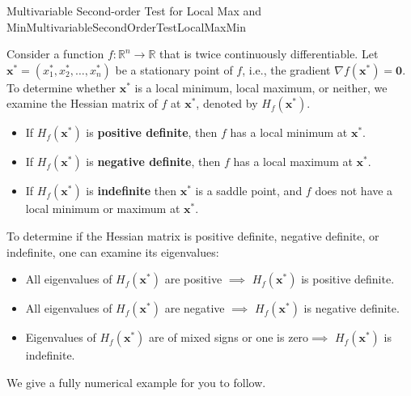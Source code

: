 \begin{propColor}{Multivariable Second-order Test for Local Max and Min}{MultivariableSecondOrderTestLocalMaxMin}


Consider a function \(f: \mathbb{R}^n \to \mathbb{R}\) that is twice continuously differentiable. Let \(\mathbf{x}^\ast = (x_1^\ast, x_2^\ast, \ldots, x_n^\ast)\) be a stationary point of \(f\), i.e., the gradient \(\nabla f(\mathbf{x}^\ast) = \mathbf{0}\). \\

To determine whether \(\mathbf{x}^\ast\) is a local minimum, local maximum, or neither, we examine the Hessian matrix of \(f\) at \(\mathbf{x}^\ast\), denoted by \(H_f(\mathbf{x}^\ast)\).



\begin{itemize}
    \item If \(H_f(\mathbf{x}^\ast)\) is \textbf{positive definite}, then \(f\) has a local minimum at \(\mathbf{x}^\ast\).
    \item If \(H_f(\mathbf{x}^\ast)\) is \textbf{negative definite}, then \(f\) has a local maximum at \(\mathbf{x}^\ast\).
    \item If \(H_f(\mathbf{x}^\ast)\) is \textbf{indefinite} then \(\mathbf{x}^\ast\) is a saddle point, and \(f\) does not have a local minimum or maximum at \(\mathbf{x}^\ast\).
\end{itemize}

To determine if the Hessian matrix is positive definite, negative definite, or indefinite, one can examine its eigenvalues:
\begin{itemize}
    \item All eigenvalues of \(H_f(\mathbf{x}^\ast)\) are positive $\implies$ \(H_f(\mathbf{x}^\ast)\) is positive definite.
    \item All eigenvalues of \(H_f(\mathbf{x}^\ast)\) are negative $\implies$ \(H_f(\mathbf{x}^\ast)\) is negative definite.
    \item Eigenvalues of \(H_f(\mathbf{x}^\ast)\) are of mixed signs or one is zero$\implies$ \(H_f(\mathbf{x}^\ast)\) is indefinite.
\end{itemize}
   
\end{propColor}

\bigskip


We give a fully numerical example for you to follow. \\

